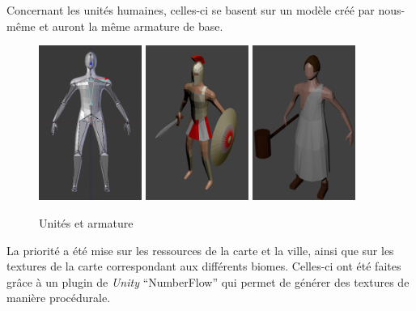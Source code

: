 \documentclass[12pt]{report}
\begin{document}
Concernant les unités humaines, celles-ci se basent sur un modèle créé par nous-même et auront la même armature de base.

\begin{figure}[H]
    \centering
    \includegraphics[width=0.3\textwidth]{unit_armature}
    \includegraphics[width=0.3\textwidth]{swordmen}
    \includegraphics[width=0.3\textwidth]{worker}
    \caption{Unités et armature}
\end{figure}

La priorité a été mise sur les ressources de la carte et la ville, ainsi que sur les textures de la carte correspondant aux différents biomes. Celles-ci ont été faites grâce à un plugin de \textit{Unity} “NumberFlow” qui permet de générer des textures de manière procédurale.
\end{document}
